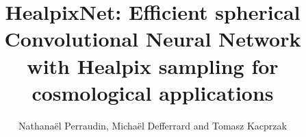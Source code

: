 \documentclass[final,twocolumn,3p,times,authoryear]{elsarticle}
\newcommand{\1}{\b{1}}              %
\newcommand{\0}{\b{0}}              %
\begin{document}
\begin{frontmatter}



\title{HealpixNet: Efficient spherical Convolutional Neural Network with Healpix sampling for cosmological applications}


\author{Nathanaël Perraudin, Michaël Defferrard and Tomasz Kacprzak}

\address{}

\begin{abstract}




\end{abstract}
\end{frontmatter}
\end{document}
